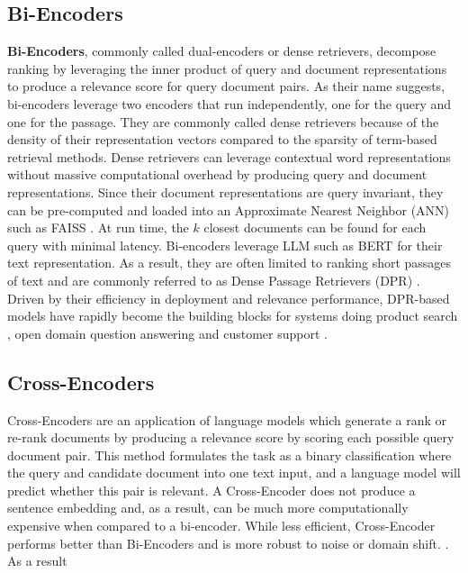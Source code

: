 \subsection{Bi-Encoders}
\textbf{Bi-Encoders}, commonly called dual-encoders or dense retrievers, decompose ranking by leveraging the inner product of query and document representations to produce a relevance score for query document pairs. As their name suggests, bi-encoders leverage two encoders that run independently, one for the query and one for the passage. They are commonly called dense retrievers because of the density of their representation vectors compared to the sparsity of term-based retrieval methods. Dense retrievers can leverage contextual word representations without massive computational overhead by producing query and document representations. Since their document representations are query invariant, they can be pre-computed and loaded into an Approximate Nearest Neighbor (ANN) such as FAISS \cite{johnson2019billion}. At run time, the $k$ closest documents can be found for each query with minimal latency. Bi-encoders leverage LLM such as BERT \cite{Devlin2019BERTPO} for their text representation. As a result, they are often limited to ranking short passages of text and are commonly referred to as Dense Passage Retrievers (DPR) \cite{Karpukhin2020DensePR} \cite{Reimers2019SentenceBERTSE}. Driven by their efficiency in deployment and relevance performance, DPR-based models have rapidly become the building blocks for systems doing product search \cite{Magnani2022SemanticRA}, open domain question answering \cite{Karpukhin2020DensePR} and customer support \cite{Mesquita2022DenseTR}. \\
\subsection{Cross-Encoders}
Cross-Encoders are an application of language models which generate a rank or re-rank documents by producing a relevance score by scoring each possible query document pair. This method formulates the task as a binary classification where the query and candidate document into one text input, and a language model will predict whether this pair is relevant. A Cross-Encoder does not produce a sentence embedding and, as a result, can be much more computationally expensive when compared to a bi-encoder. While less efficient, Cross-Encoder performs better than Bi-Encoders and is more robust to noise or domain shift. \cite{Thakur2021BEIRAH}. As a result
